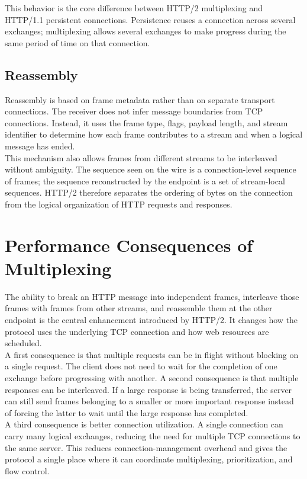 \documentclass{scrbook}
\begin{document}
This behavior is the core difference between HTTP/2 multiplexing and HTTP/1.1 persistent connections. Persistence reuses a connection across several exchanges; multiplexing allows several exchanges to make progress during the same period of time on that connection.

\subsection{Reassembly}

Reassembly is based on frame metadata rather than on separate transport connections. The receiver does not infer message boundaries from TCP connections. Instead, it uses the frame type, flags, payload length, and stream identifier to determine how each frame contributes to a stream and when a logical message has ended.\\

This mechanism also allows frames from different streams to be interleaved without ambiguity. The sequence seen on the wire is a connection-level sequence of frames; the sequence reconstructed by the endpoint is a set of stream-local sequences. HTTP/2 therefore separates the ordering of bytes on the connection from the logical organization of HTTP requests and responses.

\section{Performance Consequences of Multiplexing}

The ability to break an HTTP message into independent frames, interleave those frames with frames from other streams, and reassemble them at the other endpoint is the central enhancement introduced by HTTP/2. It changes how the protocol uses the underlying TCP connection and how web resources are scheduled.\\

A first consequence is that multiple requests can be in flight without blocking on a single request. The client does not need to wait for the completion of one exchange before progressing with another. A second consequence is that multiple responses can be interleaved. If a large response is being transferred, the server can still send frames belonging to a smaller or more important response instead of forcing the latter to wait until the large response has completed.\\

A third consequence is better connection utilization. A single connection can carry many logical exchanges, reducing the need for multiple TCP connections to the same server. This reduces connection-management overhead and gives the protocol a single place where it can coordinate multiplexing, prioritization, and flow control.
\end{document}
